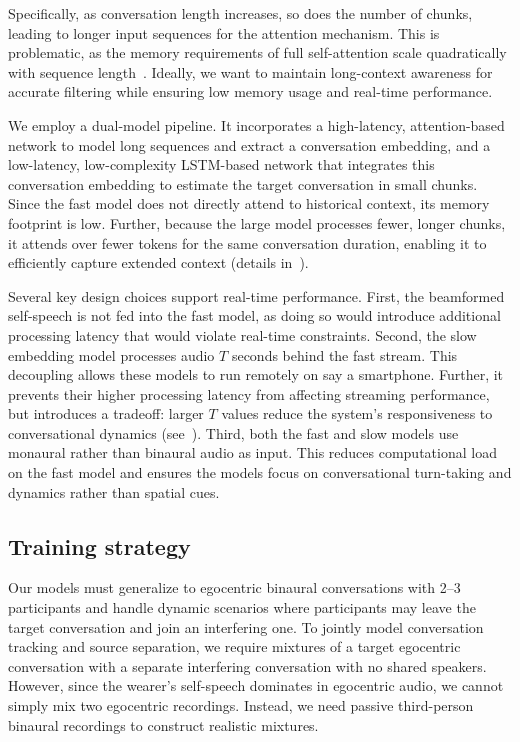 Specifically, as conversation length increases, so does the number of chunks, leading to longer input sequences for the attention mechanism. This is problematic, as the memory requirements of full self-attention scale quadratically with sequence length~\cite{ainslie2020etcencodinglongstructured,10889061}. Ideally, we want to maintain long-context awareness for accurate filtering while ensuring low memory usage and real-time performance. 

We employ a dual-model pipeline. It incorporates a high-latency, attention-based network to model long  sequences and extract a  conversation embedding, and a low-latency, low-complexity LSTM-based network that integrates this conversation embedding to estimate the target conversation in small chunks. Since the fast model does not directly attend to historical context, its memory footprint is low. Further, because the large model processes fewer, longer chunks, it attends over fewer tokens for the same conversation duration, enabling it to efficiently capture extended context (details in~).

Several key design choices support real-time performance. First, the beamformed self-speech is not fed into the fast model, as doing so would introduce additional processing latency that would violate real-time constraints. Second, the  slow embedding model processes audio $T$ seconds behind the fast stream. This decoupling allows these models to run remotely on say a smartphone. Further, it prevents their higher processing latency from affecting streaming performance, but introduces a tradeoff: larger $T$ values reduce the system’s responsiveness to  conversational dynamics (see~).  Third, both the fast and slow models use monaural rather than binaural audio as input. This reduces computational load on the fast model and ensures the models focus on conversational turn-taking and dynamics rather than spatial cues.






\subsection{Training strategy}\label{sec:training}


Our models must generalize to egocentric binaural conversations with 2–3 participants and handle dynamic scenarios where participants may leave the target conversation and join an interfering one. To jointly model conversation tracking and source separation, we require mixtures of a target egocentric conversation with a separate interfering conversation with no shared speakers. However, since the wearer's self-speech dominates in egocentric audio, we cannot simply mix two egocentric recordings. Instead, we need passive third-person binaural recordings to construct realistic mixtures.

